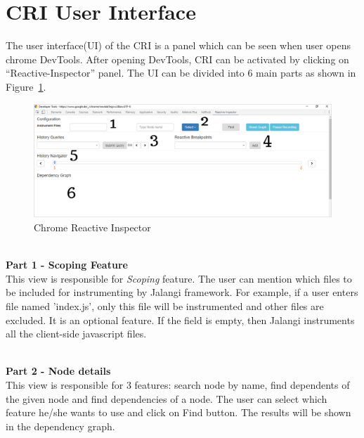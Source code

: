 \section{CRI User Interface}
The user interface(UI) of the CRI is a panel which can be seen when user opens chrome DevTools. After opening DevTools, CRI can be activated by clicking on ``Reactive-Inspector'' panel. The UI can be divided into 6 main parts as shown in Figure~\ref{fig:cri}. 

\begin{figure}[!h]
	\centering
	\includegraphics[scale=0.5,trim=0 0 0 0]{images/cri.png}
	\caption{Chrome Reactive Inspector}
	\label{fig:cri}
\end{figure}

\leavevmode
\\
\textbf{Part 1 - Scoping Feature}
\\
This view is responsible for \textit{Scoping} feature. The user can mention which files to be included for instrumenting by Jalangi framework. For example, if a user enters file named 'index.js', only this file will be instrumented and other files are excluded. It is an optional feature. If the field is empty, then Jalangi instruments all the client-side javascript files. 

\leavevmode
\\
\textbf{Part 2 - Node details}
\\
This view is responsible for 3 features: search node by name, find dependents of the given node and find dependencies of a node. The user can select which feature he/she wants to use and click on Find button. 
The results will be shown in the dependency graph. 

